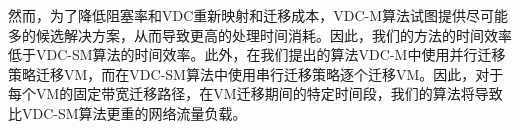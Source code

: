 然而，为了降低阻塞率和VDC重新映射和迁移成本，VDC-M算法试图提供尽可能多的候选解决方案，从而导致更高的处理时间消耗。因此，我们的方法的时间效率低于VDC-SM算法的时间效率。此外，在我们提出的算法VDC-M中使用并行迁移策略迁移VM，而在VDC-SM算法中使用串行迁移策略逐个迁移VM。因此，对于每个VM的固定带宽迁移路径，在VM迁移期间的特定时间段，我们的算法将导致比VDC-SM算法更重的网络流量负载。










































































































